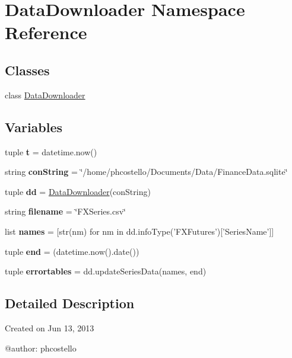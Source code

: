\hypertarget{namespaceDataDownloader}{\section{\-Data\-Downloader \-Namespace \-Reference}
\label{namespaceDataDownloader}
}
\subsection*{\-Classes}
\begin{DoxyCompactItemize}
\item 
class \hyperlink{classDataDownloader_1_1DataDownloader}{\-Data\-Downloader}
\end{DoxyCompactItemize}
\subsection*{\-Variables}
\begin{DoxyCompactItemize}
\item 
\hypertarget{namespaceDataDownloader_ad91e77a4010bea0da9c529dc7af14f99}{tuple {\bfseries t} = datetime.\-now()}\label{namespaceDataDownloader_ad91e77a4010bea0da9c529dc7af14f99}

\item 
\hypertarget{namespaceDataDownloader_a0ab4dcb24c02a90f81afad69bf7a0aca}{string {\bfseries con\-String} = \char`\"{}/home/phcostello/\-Documents/\-Data/\-Finance\-Data.\-sqlite\char`\"{}}\label{namespaceDataDownloader_a0ab4dcb24c02a90f81afad69bf7a0aca}

\item 
\hypertarget{namespaceDataDownloader_a1a78c96e92ee11aac380ffe265c82c77}{tuple {\bfseries dd} = \hyperlink{classDataDownloader_1_1DataDownloader}{\-Data\-Downloader}(con\-String)}\label{namespaceDataDownloader_a1a78c96e92ee11aac380ffe265c82c77}

\item 
\hypertarget{namespaceDataDownloader_a91b3732bc4afcd5e35d0bcea74afb3d6}{string {\bfseries filename} = \char`\"{}\-F\-X\-Series.\-csv\char`\"{}}\label{namespaceDataDownloader_a91b3732bc4afcd5e35d0bcea74afb3d6}

\item 
\hypertarget{namespaceDataDownloader_a6997ce2b3746fe697199c757441c9d86}{list {\bfseries names} = \mbox{[}str(nm) for nm in dd.\-info\-Type('\-F\-X\-Futures')\mbox{[}'\-Series\-Name'\mbox{]}\mbox{]}}\label{namespaceDataDownloader_a6997ce2b3746fe697199c757441c9d86}

\item 
\hypertarget{namespaceDataDownloader_abf23516cbcb3506d8acf81bb79dedd41}{tuple {\bfseries end} = (datetime.\-now().date())}\label{namespaceDataDownloader_abf23516cbcb3506d8acf81bb79dedd41}

\item 
\hypertarget{namespaceDataDownloader_a09fa1dc5d1124369729a0a2fa8be8baa}{tuple {\bfseries errortables} = dd.\-update\-Series\-Data(names, end)}\label{namespaceDataDownloader_a09fa1dc5d1124369729a0a2fa8be8baa}

\end{DoxyCompactItemize}


\subsection{\-Detailed \-Description}
\begin{DoxyVerb}
Created on Jun 13, 2013

@author: phcostello
\end{DoxyVerb}
 